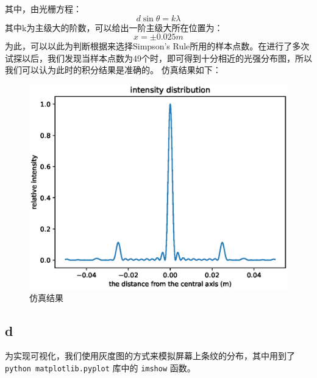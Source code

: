 \documentclass[UTF8]{ctexart}
\begin{document}
    其中，由光栅方程：
    \begin{equation*}
        d\sin \theta = k \lambda
    \end{equation*}
    其中k为主级大的阶数，可以给出一阶主级大所在位置为：
    \begin{equation*}
        x = \pm 0.025 m
    \end{equation*}
    为此，可以以此为判断根据来选择Simpson’s Rule所用的样本点数。在进行了多次试探以后，我们发现当样本点数为49个时，即可得到十分相近的光强分布图，所以我们可以认为此时的积分结果是准确的。
    仿真结果如下：
    \begin{figure}[h]
        \centering
        \includegraphics[height=0.42 \textheight]{problem4_c}
        \caption{仿真结果}\label{fig:figure4.3}
    \end{figure}

    \subsection{d}\label{subsec:section4.4}
    为实现可视化，我们使用灰度图的方式来模拟屏幕上条纹的分布，其中用到了 \texttt{python matplotlib.pyplot} 库中的 \texttt{imshow} 函数。
\end{document}
